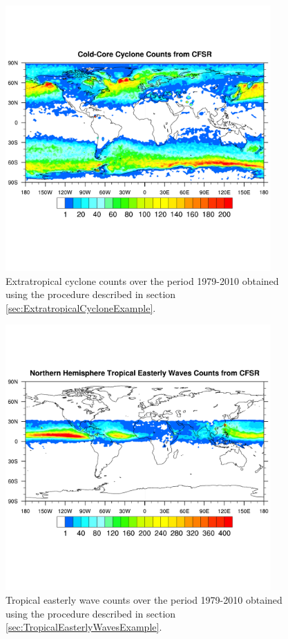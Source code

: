 \documentclass[gmdd, hvmath, online]{copernicus_discussions}
\begin{document}
\begin{figure}[H]
\begin{center}
\includegraphics[width=4in, clip, trim=0.2cm 3.6cm 0.2cm 3.1cm]{plot-cfsr_etc_density.pdf}
\end{center}
\caption{Extratropical cyclone counts over the period 1979-2010 obtained using the procedure described in section \ref{sec:ExtratropicalCycloneExample}.} \label{fig:ExtratropicalCycloneDensity}
\end{figure}

\begin{figure}[H]
\begin{center}
\includegraphics[width=4in, clip, trim=0.2cm 3.6cm 0.2cm 3.1cm]{plot-cfsr_tew_density.pdf}
\end{center}
\caption{Tropical easterly wave counts over the period 1979-2010 obtained using the procedure described in section \ref{sec:TropicalEasterlyWavesExample}.} \label{fig:TropicalEasterlyWaveDensity}
\end{figure}
\end{document}
